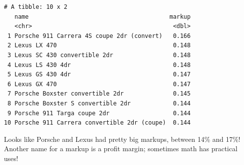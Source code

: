 \documentclass[
  letterpaper,
]{book}
\begin{document}
\begin{verbatim}
# A tibble: 10 x 2
   name                                        markup
   <chr>                                        <dbl>
 1 Porsche 911 Carrera 4S coupe 2dr (convert)   0.166
 2 Lexus LX 470                                 0.148
 3 Lexus SC 430 convertible 2dr                 0.148
 4 Lexus LS 430 4dr                             0.148
 5 Lexus GS 430 4dr                             0.147
 6 Lexus GX 470                                 0.147
 7 Porsche Boxster convertible 2dr              0.145
 8 Porsche Boxster S convertible 2dr            0.144
 9 Porsche 911 Targa coupe 2dr                  0.144
10 Porsche 911 Carrera convertible 2dr (coupe)  0.144
\end{verbatim}

Looks like Porsche and Lexus had pretty big markups, between 14\% and
17\%! Another name for a markup is a profit margin; sometimes math has
practical uses!
\end{document}
